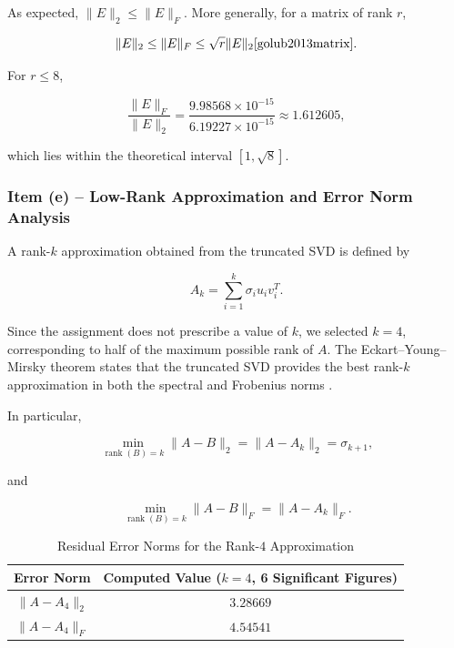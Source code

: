 As expected, $\|E\|_2\leq\|E\|_F$. More generally, for a matrix of rank $r$,

\begin{equation}
    \|E\|_2\leq\|E\|_F\leq\sqrt{r}\|E\|_2
    \cite[Section 2.7]{golub2013matrix}.
\end{equation}

For $r\leq8$,

\begin{equation}
    \frac{\|E\|_F}{\|E\|_2}
    =
    \frac{9.98568\times10^{-15}}
         {6.19227\times10^{-15}}
    \approx1.612605,
\end{equation}

which lies within the theoretical interval $[1,\sqrt{8}]$.

\subsubsection*{Item (e) -- Low-Rank Approximation and Error Norm Analysis}

A rank-$k$ approximation obtained from the truncated SVD is defined by

\begin{equation}
    A_k=\sum_{i=1}^{k}\sigma_i u_i v_i^T.
\end{equation}

Since the assignment does not prescribe a value of $k$, we selected $k=4$, corresponding to half of the maximum possible rank of $A$. The Eckart--Young--Mirsky theorem states that the truncated SVD provides the best rank-$k$ approximation in both the spectral and Frobenius norms \cite[Theorem 2.4.8]{golub2013matrix}.

In particular,

\begin{equation}
    \min_{\operatorname{rank}(B)=k}\|A-B\|_2
    =
    \|A-A_k\|_2
    =
    \sigma_{k+1},
\end{equation}

and

\begin{equation}
    \min_{\operatorname{rank}(B)=k}\|A-B\|_F
    =
    \|A-A_k\|_F.
\end{equation}

\begin{table}[H]
\centering
\caption{Residual Error Norms for the Rank-$4$ Approximation}
\label{tab:rank_k_error}
\begin{tabular}{cc}
\toprule
\textbf{Error Norm} & \textbf{Computed Value ($k=4$, 6 Significant Figures)} \\
\midrule
$\|A-A_4\|_2$ & $3.28669$ \\
$\|A-A_4\|_F$ & $4.54541$ \\
\bottomrule
\end{tabular}
\end{table}

